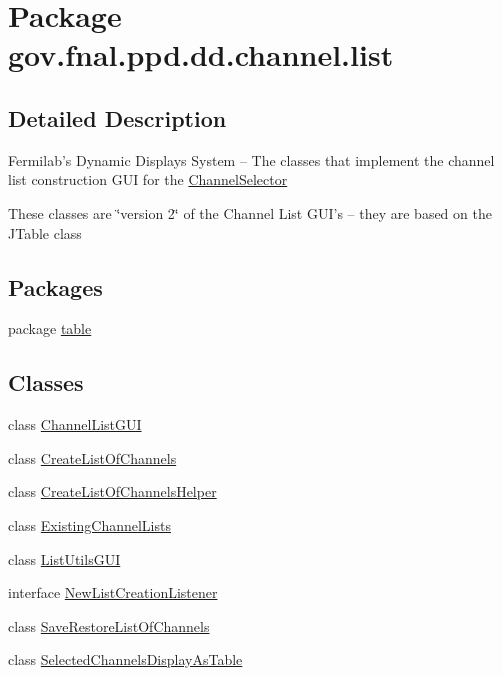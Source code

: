 \hypertarget{namespacegov_1_1fnal_1_1ppd_1_1dd_1_1channel_1_1list}{\section{Package gov.\-fnal.\-ppd.\-dd.\-channel.\-list}
\label{namespacegov_1_1fnal_1_1ppd_1_1dd_1_1channel_1_1list}
}


\subsection{Detailed Description}
Fermilab's Dynamic Displays System -- The classes that implement the channel list construction G\-U\-I for the \hyperlink{classgov_1_1fnal_1_1ppd_1_1dd_1_1ChannelSelector}{Channel\-Selector}

These classes are \char`\"{}version 2\char`\"{} of the Channel List G\-U\-I's -- they are based on the J\-Table class\subsection*{Packages}
\begin{DoxyCompactItemize}
\item 
package \hyperlink{namespacegov_1_1fnal_1_1ppd_1_1dd_1_1channel_1_1list_1_1table}{table}
\end{DoxyCompactItemize}
\subsection*{Classes}
\begin{DoxyCompactItemize}
\item 
class \hyperlink{classgov_1_1fnal_1_1ppd_1_1dd_1_1channel_1_1list_1_1ChannelListGUI}{Channel\-List\-G\-U\-I}
\item 
class \hyperlink{classgov_1_1fnal_1_1ppd_1_1dd_1_1channel_1_1list_1_1CreateListOfChannels}{Create\-List\-Of\-Channels}
\item 
class \hyperlink{classgov_1_1fnal_1_1ppd_1_1dd_1_1channel_1_1list_1_1CreateListOfChannelsHelper}{Create\-List\-Of\-Channels\-Helper}
\item 
class \hyperlink{classgov_1_1fnal_1_1ppd_1_1dd_1_1channel_1_1list_1_1ExistingChannelLists}{Existing\-Channel\-Lists}
\item 
class \hyperlink{classgov_1_1fnal_1_1ppd_1_1dd_1_1channel_1_1list_1_1ListUtilsGUI}{List\-Utils\-G\-U\-I}
\item 
interface \hyperlink{interfacegov_1_1fnal_1_1ppd_1_1dd_1_1channel_1_1list_1_1NewListCreationListener}{New\-List\-Creation\-Listener}
\item 
class \hyperlink{classgov_1_1fnal_1_1ppd_1_1dd_1_1channel_1_1list_1_1SaveRestoreListOfChannels}{Save\-Restore\-List\-Of\-Channels}
\item 
class \hyperlink{classgov_1_1fnal_1_1ppd_1_1dd_1_1channel_1_1list_1_1SelectedChannelsDisplayAsTable}{Selected\-Channels\-Display\-As\-Table}
\end{DoxyCompactItemize}
